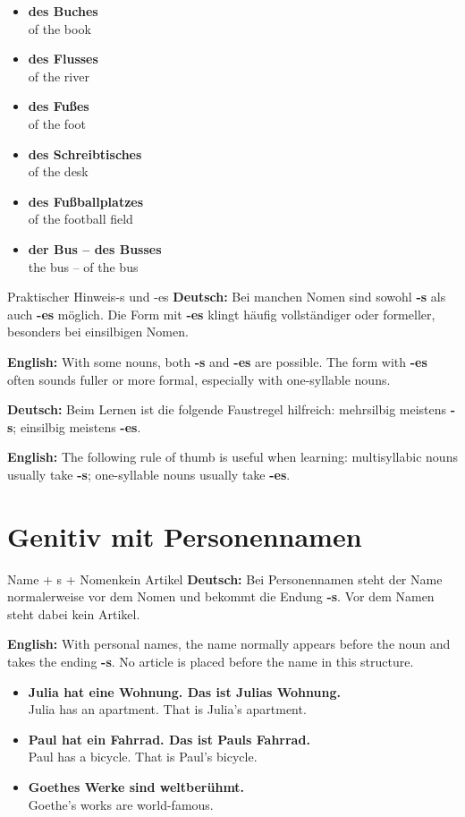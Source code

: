 \documentclass[a4paper,11pt]{article}
\newcommand{\GermanText}[1]{\textbf{Deutsch: }#1\par}
\newcommand{\EnglishText}[1]{{\small\color{SoftGray}\textbf{English: }#1\par}}
\newcommand{\ExampleItem}[2]{\item \textbf{#1}\\{\small\color{SoftGray}#2}}
\begin{document}
        \begin{exbox}
            \begin{itemize}
                \ExampleItem{des Buches}{of the book}
                \ExampleItem{des Flusses}{of the river}
                \ExampleItem{des Fußes}{of the foot}
                \ExampleItem{des Schreibtisches}{of the desk}
                \ExampleItem{des Fußballplatzes}{of the football field}
                \ExampleItem{der Bus -- des Busses}{the bus -- of the bus}
            \end{itemize}
        \end{exbox}

        \begin{grammarentry}{Praktischer Hinweis}{-s und -es}
            \GermanText{Bei manchen Nomen sind sowohl \textbf{-s} als auch \textbf{-es} möglich. Die Form mit \textbf{-es} klingt häufig vollständiger oder formeller, besonders bei einsilbigen Nomen.}
            \EnglishText{With some nouns, both \textbf{-s} and \textbf{-es} are possible. The form with \textbf{-es} often sounds fuller or more formal, especially with one-syllable nouns.}

            \GermanText{Beim Lernen ist die folgende Faustregel hilfreich: mehrsilbig meistens \textbf{-s}; einsilbig meistens \textbf{-es}.}
            \EnglishText{The following rule of thumb is useful when learning: multisyllabic nouns usually take \textbf{-s}; one-syllable nouns usually take \textbf{-es}.}
        \end{grammarentry}

    \section{Genitiv mit Personennamen}

        \begin{grammarentry}{Name + s + Nomen}{kein Artikel}
            \GermanText{Bei Personennamen steht der Name normalerweise vor dem Nomen und bekommt die Endung \textbf{-s}. Vor dem Namen steht dabei kein Artikel.}
            \EnglishText{With personal names, the name normally appears before the noun and takes the ending \textbf{-s}. No article is placed before the name in this structure.}
        \end{grammarentry}

        \begin{exbox}
            \begin{itemize}
                \ExampleItem{Julia hat eine Wohnung. Das ist Julias Wohnung.}{Julia has an apartment. That is Julia's apartment.}
                \ExampleItem{Paul hat ein Fahrrad. Das ist Pauls Fahrrad.}{Paul has a bicycle. That is Paul's bicycle.}
                \ExampleItem{Goethes Werke sind weltberühmt.}{Goethe's works are world-famous.}
            \end{itemize}
        \end{exbox}
\end{document}
